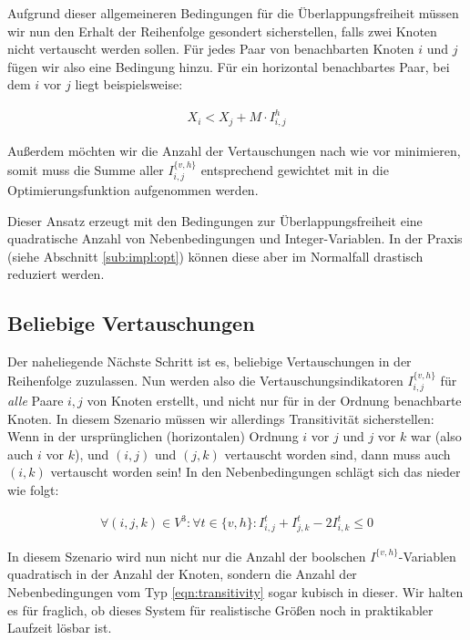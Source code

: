 Aufgrund dieser allgemeineren Bedingungen für die Überlappungsfreiheit müssen wir nun den Erhalt der Reihenfolge gesondert sicherstellen, falls zwei Knoten nicht vertauscht werden sollen. Für jedes Paar von benachbarten Knoten $i$ und $j$ fügen wir also eine Bedingung hinzu. Für ein horizontal benachbartes Paar, bei dem $i$ vor $j$ liegt beispielsweise:

\begin{align}
	X_i < X_j + M \cdot I^{h}_{i,j}
\end{align}

Außerdem möchten wir die Anzahl der Vertauschungen nach wie vor minimieren, somit muss die Summe aller $I^{\{v,h\}}_{i,j}$ entsprechend gewichtet mit in die Optimierungsfunktion aufgenommen werden.

Dieser Ansatz erzeugt mit den Bedingungen zur Überlappungsfreiheit eine quadratische Anzahl von Nebenbedingungen und Integer-Variablen. In der Praxis (siehe Abschnitt \ref{sub:impl:opt}) können diese aber im Normalfall drastisch reduziert werden.

\subsection{Beliebige Vertauschungen}

Der naheliegende Nächste Schritt ist es, beliebige Vertauschungen in der Reihenfolge zuzulassen. Nun werden also die Vertauschungsindikatoren $I^{\{v,h\}}_{i,j}$ für \textit{alle} Paare $i,j$ von Knoten erstellt, und nicht nur für in der Ordnung benachbarte Knoten. In diesem Szenario müssen wir allerdings Transitivität sicherstellen: Wenn in der ursprünglichen (horizontalen) Ordnung $i$ vor $j$ und $j$ vor $k$ war (also auch $i$ vor $k$), und $(i,j)$ und $(j,k)$ vertauscht worden sind, dann muss auch $(i,k)$ vertauscht worden sein! In den Nebenbedingungen schlägt sich das nieder wie folgt:

\begin{align}
	\forall (i,j,k) \in V^3 : \forall t \in \{v,h\} :  I^{t}_{i,j} + I^{t}_{j,k} - 2 I^{t}_{i,k} \leq 0 \label{eqn:transitivity}
\end{align}

In diesem Szenario wird nun nicht nur die Anzahl der boolschen $I^{\{v,h\}}$-Variablen quadratisch in der Anzahl der Knoten, sondern die Anzahl der Nebenbedingungen vom Typ \ref{eqn:transitivity} sogar kubisch in dieser. Wir halten es für fraglich, ob dieses System für realistische Größen noch in praktikabler Laufzeit lösbar ist.

